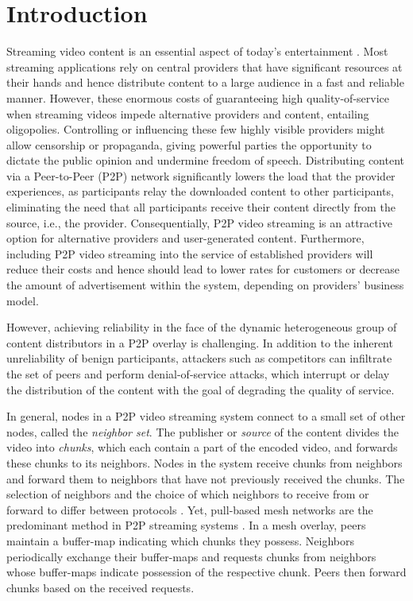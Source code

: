 \section{Introduction}
\label{sec:intro}

Streaming video content is an essential aspect of today's entertainment \cite{emule}.
Most streaming applications rely on central providers that have significant resources at their hands and hence distribute content to a large audience in a fast and reliable manner. 
However, these enormous costs of guaranteeing high quality-of-service when streaming videos impede alternative providers and content, entailing oligopolies. Controlling or influencing these few highly visible providers might allow censorship or propaganda, giving powerful parties the opportunity  to dictate the public opinion and undermine freedom of speech.
Distributing content via a Peer-to-Peer (P2P) network significantly lowers the load that the provider experiences, as participants relay the downloaded content to other participants, eliminating the need that all participants receive their content directly from the source, i.e., the provider. 
Consequentially, P2P video streaming is an attractive option for alternative providers and user-generated content. Furthermore, including 
P2P video streaming into the service of established providers will reduce their costs and hence should lead to lower rates for customers or decrease the amount of advertisement within the system, depending on providers' business model. 


However, achieving reliability in the face of the dynamic heterogeneous group of content distributors in a P2P overlay is challenging. In addition to the inherent unreliability of benign participants, attackers such as competitors can infiltrate the set of peers and perform denial-of-service attacks, which interrupt or delay the distribution of the content with the goal of degrading the quality of service. 

In general, nodes in a P2P video streaming system connect to a small set of other nodes, called the \emph{neighbor set}. 
The publisher or \emph{source} of the content divides the video into \emph{chunks}, which each contain a part of the encoded video, and forwards these chunks to its neighbors. Nodes in the system receive chunks from neighbors and forward them to neighbors that have not previously received the chunks. 
The selection of neighbors and the choice of which neighbors to receive from or forward to differ between protocols \cite{sasi2014survey}.  Yet, pull-based mesh networks are the predominant method in P2P streaming systems \cite{zhang2014modeling}. In a mesh overlay, peers maintain a buffer-map indicating which chunks they possess.  Neighbors periodically exchange their buffer-maps and requests chunks from neighbors whose buffer-maps indicate possession of the respective chunk. Peers then forward chunks based on the received requests. 

